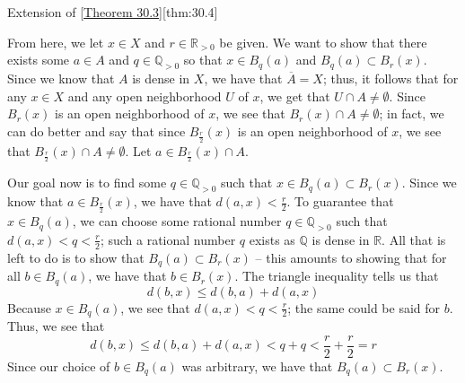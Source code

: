 \begin{thmBox}{Extension of [\hyperlink{thm:30.3}{Theorem 30.3}]}[thm:30.4]
\begin{proofBox}
        \baseSkip

        From here, we let \( x \in X \) and \( r \in \mathbb{R}_{ > 0 } \) be given.
        We want to show that there exists some \( a \in A \) and 
        \( q \in \mathbb{Q}_{ > 0 } \) so that \( x \in B_{ q }( a ) \) and 
        \( B_{ q }( a ) \subset B_{ r }( x ) \).
        Since we know that \( A \) is dense in \( X \), we have that 
        \( \overline{ A } = X \); thus, it follows that for any \( x \in X \) and any 
        open neighborhood \( U \) of \( x \), we get that \( U \cap A \neq \emptyset \).
        Since \( B_{ r }( x ) \) is an open neighborhood of \( x \), we see that 
        \( B_{ r }( x ) \cap A \neq \emptyset \); in fact, we can do better and
        say that since \( B_{ \frac{ r }{ 2 } }( x ) \) is an open neighborhood of 
        \( x \), we see that \( B_{ \frac{ r }{ 2 } }( x ) \cap A \neq \emptyset \).
        Let \( a \in B_{ \frac{ r }{ 2 } }( x ) \cap A \).

        \baseSkip

        Our goal now is to find some \( q \in \mathbb{Q}_{ > 0 } \) such that 
        \( x \in B_{ q }( a ) \subset B_{ r }( x ) \).
        Since we know that \( a \in B_{ \frac{ r }{ 2 } }( x ) \), we have that 
        \( d ( a, x ) < \frac{ r }{ 2 } \).
        To guarantee that \( x \in B_{ q }( a ) \), we can choose some rational number
        \( q \in \mathbb{Q}_{ > 0 } \) such that \( d ( a, x ) < q < \frac{ r }{ 2 } \);
        such a rational number \( q \) exists as \( \mathbb{Q} \) is dense in 
        \( \mathbb{R} \).
        All that is left to do is to show that \( B_{ q }( a ) \subset B_{ r }( x ) \)
        -- this amounts to showing that for all \( b \in B_{ q }( a ) \), 
        we have that \( b \in B_{ r }( x ) \).
        The triangle inequality tells us that
        \begin{equation*}
            d ( b, x )
            \leq 
            d ( b, a ) + d ( a, x )
        \end{equation*}
        Because \( x \in B_{ q }( a ) \), we see that 
        \( d ( a, x ) < q < \frac{ r }{ 2 } \); the same could be said for \( b \).
        Thus, we see that 
        \begin{equation*}
            d ( b, x )
            \leq 
            d ( b, a ) + d ( a, x ) 
            < 
            q + q
            <
            \frac{ r }{ 2 } + \frac{ r }{ 2 } = r
        \end{equation*}
        Since our choice of \( b \in B_{ q }( a ) \) was arbitrary, we have that 
        \( B_{ q }( a ) \subset B_{ r }( x ) \).


\end{proofBox}
\end{thmBox}
